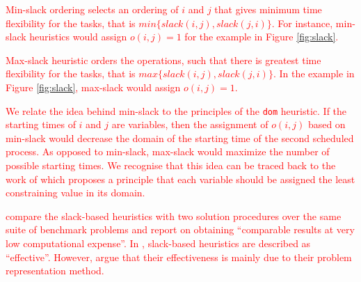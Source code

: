 \documentclass{mprop}
\theoremstyle{definition}
\begin{document}
\textcolor{red}{
Min-slack ordering selects an ordering of $i$ and $j$ that gives minimum time flexibility for the tasks, that is $min\{slack(i, j), slack(j, i)\}$. For instance, min-slack heuristics would assign $o(i,j) = 1$ for the example in Figure \ref{fig:slack}.}

\textcolor{red}{
Max-slack heuristic orders the operations, such that there is greatest time flexibility for the tasks, that is $max\{slack(i, j), slack(j, i)\}$. In the example in Figure \ref{fig:slack}, max-slack would assign $o(i,j) = 1$.}

\textcolor{red}{We relate the idea behind min-slack to the principles of the \texttt{dom} heuristic. If the starting times of $i$ and $j$ are variables, then the assignment of $o(i,j)$ based on min-slack would decrease the domain of the starting time of the second scheduled process. As opposed to min-slack, max-slack would maximize the number of possible starting times. We recognise that this idea can be traced back to the work of \citet{Geelen92} which proposes a principle that each variable should be assigned the least constraining value in its domain.}

\textcolor{red}{
\citet{Smith93} compare the slack-based heuristics with two solution procedures over the same suite of benchmark problems and report on obtaining ``comparable results at very low computational expense''. In \citet[p.~105]{cpbible}, slack-based heuristics are described as ``effective''. However, \citet{Crawford94} argue that their effectiveness is mainly due to their problem representation method.}



\end{document}
